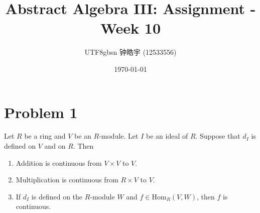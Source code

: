 \documentclass[12pt, a4paper]{article}
\title{Abstract Algebra III: Assignment - Week 10}
\author{
    \begin{CJK*}{UTF8}{gbsn}
    钟皓宇 (12533556)
    \end{CJK*}
}
\date{\today}
\theoremstyle{remark}
\begin{document}
\maketitle
\section*{Problem 1}
Let $R$ be a ring and $V$ be an $R$-module. Let $I$ be an ideal of $R$. Suppose that $d_I$ is defined on $V$ and on $R$. Then
\begin{enumerate}
    \item[(i)] Addition is continuous from $V \times V$ to $V$.
    \item[(ii)] Multiplication is continuous from $R \times V$ to $V$.
    \item[(iii)] If $d_I$ is defined on the $R$-module $W$ and $f \in \mathrm{Hom}_R(V,W)$, then $f$ is continuous.
\end{enumerate}
\end{document}
